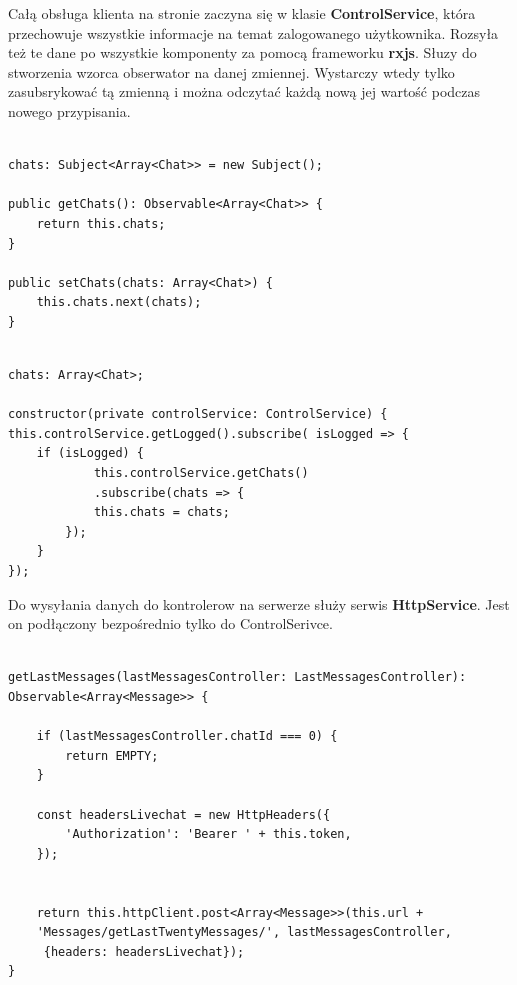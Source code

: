 \documentclass[12pt,a4paper]{article}
\begin{document}
\hspace*{0.7cm} Całą obsługa klienta na stronie zaczyna się w klasie \textbf{ControlService}, która przechowuje wszystkie informacje na temat zalogowanego użytkownika. Rozsyła też te dane po wszystkie komponenty za pomocą frameworku \textbf{rxjs}. Słuzy do stworzenia wzorca obserwator na danej zmiennej. Wystarczy wtedy tylko zasubsrykować tą zmienną i można odczytać każdą nową jej wartość podczas nowego przypisania.

\begin{lstlisting}[caption={Obsługa wzorca obserwator po stronie serwisu}]

chats: Subject<Array<Chat>> = new Subject();

public getChats(): Observable<Array<Chat>> {
	return this.chats;
}

public setChats(chats: Array<Chat>) {
	this.chats.next(chats);
}
\end{lstlisting}

\begin{lstlisting}[caption={Obsługa wzorca obserwator po stronie klienta}]

chats: Array<Chat>;

constructor(private controlService: ControlService) {
this.controlService.getLogged().subscribe( isLogged => {
	if (isLogged) {
			this.controlService.getChats()
			.subscribe(chats => {
			this.chats = chats;
		});
	}
});
\end{lstlisting}

\hspace*{0.7cm} Do wysyłania danych do kontrolerow na serwerze służy serwis \textbf{HttpService}. Jest on podłączony bezpośrednio tylko do ControlSerivce. 

\begin{lstlisting}[caption={Implementacja pobierania wiadmości}]

getLastMessages(lastMessagesController: LastMessagesController): 
Observable<Array<Message>> {

	if (lastMessagesController.chatId === 0) {
		return EMPTY;
	}
	
	const headersLivechat = new HttpHeaders({
		'Authorization': 'Bearer ' + this.token,
	});
	

	return this.httpClient.post<Array<Message>>(this.url + 
	'Messages/getLastTwentyMessages/', lastMessagesController,
	 {headers: headersLivechat});
}
\end{lstlisting}
\end{document}
